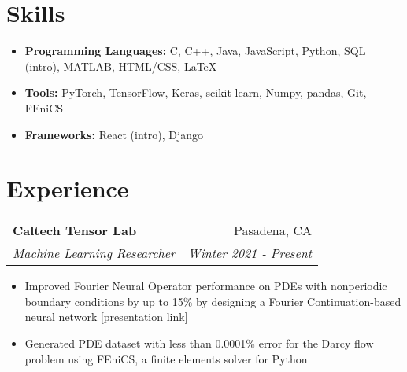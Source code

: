 \documentclass[letterpaper,11pt]{article}
\makeatletter
\newcommand{\resitem}[1]{\item[--] #1 \vspace{-8pt}}
\newcommand{\ressubheading}[4]{
	\vspace{6pt}
	\begin{tabular*}{7.5in}{l@{\extracolsep{\fill}}r}
			\textbf{#1} & #2 \\
			\textit{#3} & \textit{#4}
	\end{tabular*}
	\vspace{-12pt}
}
\newcommand{\myitem}[1]{\item[--] #1 \vspace{-8pt}}
\newcommand{\mysubitem}[1]{\item #1 \vspace{-4pt}}
\makeatother
\begin{document}


\section{Skills}

\begin{itemize}[leftmargin=*]
	\resitem {\textbf{Programming Languages:} C, C++, Java, JavaScript, Python, SQL (intro), MATLAB, HTML/CSS, \LaTeX}
	\resitem {\textbf{Tools:} PyTorch, TensorFlow, Keras, scikit-learn, Numpy, pandas, Git, FEniCS}
	\resitem{\textbf{Frameworks:} React (intro), Django}
\end{itemize}


\section{Experience}

	\ressubheading{Caltech Tensor Lab}{Pasadena, CA}{Machine Learning Researcher}{Winter 2021 - Present}
		\begin{itemize}[leftmargin=*]
			\resitem{Improved Fourier Neural Operator performance on PDEs with nonperiodic boundary conditions by up to 15\% by designing a Fourier Continuation-based neural network \href{https://symposium.foragerone.com/caltech-sfp-summer-seminar-day-2021/presentations/32348}{[presentation link]}}
			\resitem{Generated PDE dataset with less than 0.0001\% error for the Darcy flow problem using FEniCS, a finite elements solver for Python}
		\end{itemize}
\end{document}
